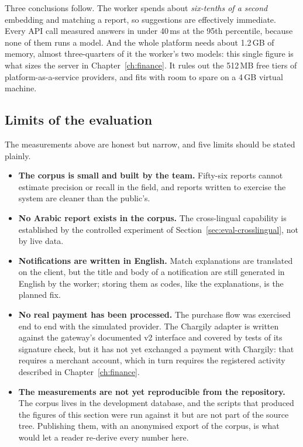 Three conclusions follow. The worker spends about \emph{six-tenths of a
second} embedding and matching a report, so suggestions are effectively
immediate. Every API call measured answers in under 40\,ms at the 95th
percentile, because none of them runs a model. And the whole platform needs
about 1.2\,GB of memory, almost three-quarters of it the worker's two models:
this single figure is what sizes the server in Chapter~\ref{ch:finance}. It
rules out the 512\,MB free tiers of platform-as-a-service providers, and fits
with room to spare on a 4\,GB virtual machine.

\subsection{Limits of the evaluation}

The measurements above are honest but narrow, and five limits should be stated
plainly.

\begin{itemize}[leftmargin=1.4em,itemsep=3pt]
  \item \textbf{The corpus is small and built by the team.} Fifty-six reports
        cannot estimate precision or recall in the field, and reports written
        to exercise the system are cleaner than the public's.
  \item \textbf{No Arabic report exists in the corpus.} The cross-lingual
        capability is established by the controlled experiment of
        Section~\ref{sec:eval-crosslingual}, not by live data.
  \item \textbf{Notifications are written in English.} Match explanations are
        translated on the client, but the title and body of a notification are
        still generated in English by the worker; storing them as codes, like
        the explanations, is the planned fix.
  \item \textbf{No real payment has been processed.} The purchase flow was
        exercised end to end with the simulated provider. The Chargily adapter
        is written against the gateway's documented v2 interface and covered by
        tests of its signature check, but it has not yet exchanged a payment
        with Chargily: that requires a merchant account, which in turn requires
        the registered activity described in Chapter~\ref{ch:finance}.
  \item \textbf{The measurements are not yet reproducible from the repository.}
        The corpus lives in the development database, and the scripts that
        produced the figures of this section were run against it but are not
        part of the source tree. Publishing them, with an anonymised export of
        the corpus, is what would let a reader re-derive every number here.
\end{itemize}

